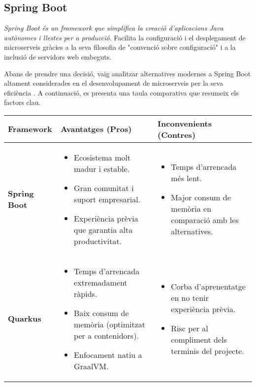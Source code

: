 \subsection{Spring Boot}
\textit{Spring Boot és un framework que simplifica la creació d'aplicacions Java autònomes i llestes per a producció}. Facilita la configuració i el desplegament de microserveis gràcies a la seva filosofia de "convenció sobre configuració" i a la inclusió de servidors web embeguts. 

Abans de prendre una decisió, vaig analitzar alternatives modernes a Spring Boot altament considerades en el desenvolupament de microserveis per la seva eficiència \cite{baeldung-spring-alternatives}. A continuació, es presenta una taula comparativa que resumeix els factors clau.

\begin{table}[h]
\centering
\begin{tabular}{|l|p{5cm}|p{5cm}|}
\hline
\textbf{Framework} & \textbf{Avantatges (Pros)} & \textbf{Inconvenients (Contres)} \\
\hline
\textbf{Spring Boot} & 
\begin{itemize}
    \item Ecosistema molt madur i estable.
    \item Gran comunitat i suport empresarial.
    \item Experiència prèvia que garantia alta productivitat.
\end{itemize} & 
\begin{itemize}
    \item Temps d'arrencada més lent.
    \item Major consum de memòria en comparació amb les alternatives.
\end{itemize} \\
\hline
\textbf{Quarkus} & 
\begin{itemize}
    \item Temps d'arrencada extremadament ràpids.
    \item Baix consum de memòria (optimitzat per a contenidors).
    \item Enfocament natiu a GraalVM.
\end{itemize} & 
\begin{itemize}
    \item Corba d'aprenentatge en no tenir experiència prèvia.
    \item Risc per al compliment dels terminis del projecte.
\end{itemize} \\

\end{tabular}
\end{table}
